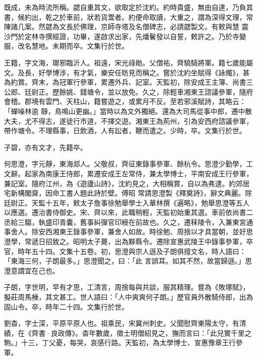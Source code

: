 \begin{pinyinscope}
 既成，未為時流所稱。勰自重其文，欲取定於沈約。約時貴盛，無由自達，乃負其書，候約出，乾之於車前，狀若貨鬻者。約便命取讀，大重之，謂為深得文理，常陳諸几案。然勰為文長於佛理，京師寺塔及名僧碑志，必請勰製文。有敕與慧
 震沙門於定林寺撰經證，功畢，遂啟求出家，先燔鬢發以自誓，敕許之。乃於寺變服，改名慧地。未期而卒。文集行於世。



 王籍，字文海，瑯邪臨沂人。祖遠，宋光祿勛。父僧祐，齊驍騎將軍。籍七歲能屬文。及長，好學博涉，有才氣，樂安任昉見而稱之。嘗於沈約坐賦得《詠燭》，甚為約賞。齊末，為冠軍行參軍，累遷外兵、記室。天監初，除安成王主簿、尚書三公郎、廷尉正。歷餘姚、錢塘令，並以放免。久之，除輕車湘東王諮議參軍，隨府會稽。郡境有雲門、天柱山，籍嘗遊之，或累月不反。至若邪溪賦詩，其略云：「蟬噪林逾
 靜，鳥鳴山更幽。」當時以為文外獨絕。還為大司馬從事中郎，遷中散大夫，尤不得志，遂徒行市道，不擇交遊。湘東王為荊州，引為安西府諮議參軍，帶作塘令。不理縣事，日飲酒，人有訟者，鞭而遣之。少時，卒。文集行於世。



 子碧，亦有文才，先籍卒。



 何思澄，字元靜，東海郯人。父敬叔，齊征東錄事參軍、餘杭令。思澄少勤學，工文辭。起家為南康王侍郎，累遷安成王左常侍，兼太學博士，平南安成王行參軍，兼記室。隨府江州，為《遊廬山詩》，沈約見之，大相稱賞，自以為弗逮。約郊居宅新構閣齋，因命工書人題此詩於壁。傅昭
 常請思澄製《釋奠詩》，辭文典麗。除廷尉正。天監十五年，敕太子詹事徐勉舉學士入華林撰《遍略》，勉舉思澄等五人以應選。遷治書侍御史。宋、齊以來，此職稍輕，天監初始重其選。車前依尚書二丞給三騶，執盛印青囊，舊事糾彈官印綬在前故也。久之，遷秣陵令，入兼東宮通事舍人。除安西湘東王錄事參軍，兼舍人如故。時徐勉、周捨以才具當朝，並好思澄學，常遞日招致之。昭明太子薨，出為黟縣令。遷除宣惠武陵王中錄事參軍，卒官，時年五十四。文集十五卷。初，思澄與宗人遜及子朗俱擅文名，時人語曰：「東海三何，子朗最多。」思澄聞之，曰：「此
 言誤耳。如其不然，故當歸遜。」思澄意謂宜在己也。



 子朗，字世明，早有才思，工清言，周捨每與共談，服其精理。嘗為《敗塚賦》，擬莊周馬棰，其文甚工。世人語曰：「人中爽爽何子朗。」歷官員外散騎侍郎，出為固山令。卒，時年二十四。文集行於世。



 劉杳，字士深，平原平原人也。祖乘民，宋冀州刺史。父聞慰齊東陽太守，有清績，在《齊書·良政傳》。杳年數歲，徵士明僧紹見之，撫而言曰：「此兒實千里之駒。」十三，丁父憂，每哭，哀感行路。天監初，為太學博士、宣惠豫章王行參軍。




\end{pinyinscope}
